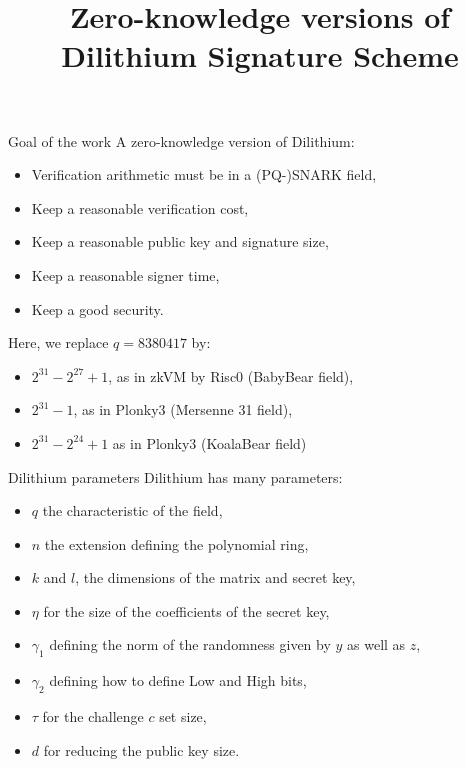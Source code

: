 \documentclass[aspectratio=169]{beamer}
\title{Zero-knowledge versions of Dilithium Signature Scheme}
\author{}
\date{}
\begin{document}
\begin{frame}
    \maketitle
\end{frame}


\begin{frame}{Goal of the work}
    A zero-knowledge version of Dilithium:
    \begin{itemize}
        \item Verification arithmetic must be in a (PQ-)SNARK field,
        \item Keep a reasonable verification cost,
        \item Keep a reasonable public key and signature size,
        \item Keep a reasonable signer time,
        \item Keep a good security.
    \end{itemize}
    \pause
    Here, we replace $q= 8380417$ by:
    \begin{itemize}
        \item $2^{31}-2^{27}+1$, as in zkVM by Risc0 (BabyBear field),
        \item $2^{31}-1$, as in Plonky3 (Mersenne 31 field),
        \item $2^{31} - 2^{24}+1$ as in Plonky3 (KoalaBear field)
    \end{itemize}
\end{frame}

\begin{frame}{Dilithium parameters}
    Dilithium has many parameters:
    \begin{itemize}
        \item $q$ the characteristic of the field, 
        \item $n$ the extension defining the polynomial ring,
        \item $k$ and $l$, the dimensions of the matrix and secret key,
        \item $\eta$ for the size of the coefficients of the secret key,
        \item $\gamma_1$ defining the norm of the randomness given by $y$ as well as $z$,
        \item $\gamma_2$ defining how to define Low and High bits,
        \item $\tau$ for the challenge $c$ set size,
        \item $d$ for reducing the public key size.
    \end{itemize}
\end{frame}
\end{document}
